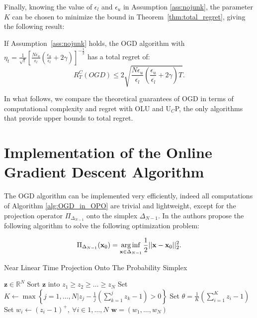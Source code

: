 Finally, knowing the value of $\epsilon_l$ and $\epsilon_u$ in Assumption \ref{ass:nojunk}, the parameter $K$ can be chosen to minimize the bound in Theorem~\ref{thm:total_regret}, giving the following result:

\begin{corollary} \label{cor:optimal_bound}
    If Assumption~\ref{ass:nojunk} holds, the OGD algorithm with $\eta_t = \frac{1}{\sqrt{t}} \left[ \frac{N \epsilon_u}{\epsilon_l} \left( \frac{\epsilon_u}{\epsilon_l} + 2 \gamma \right) \right]^{-\frac{1}{2}}$ has a total regret of:
    \begin{equation*}
        R_T^C(OGD) \leq 2\sqrt{\frac{N \epsilon_u}{\epsilon_l}\left( \frac{\epsilon_u}{\epsilon_l} + 2 \gamma \right) T}.
    \end{equation*}
\end{corollary}

In what follows, we compare the theoretical guarantees of OGD in terms of computational complexity and regret with OLU and U$_C$P, the only algorithms that provide upper bounds to total regret.

\section{Implementation of the Online Gradient Descent Algorithm}\label{sec:implementation}

The OGD algorithm can be implemented very efficiently, indeed all computations of Algorithm \ref{alg:OGD_in_OPO} are trivial and lightweight, except for the projection operator $\Pi_{\Delta_{N-1}}$ onto the simplex $\Delta_{N-1}$. In \cite{duchi2008efficient} the authors propose the following algorithm to solve the following optimization problem:

\begin{equation}
\Pi_{\Delta_{N-1}}(\mathbf x_0)=\operatorname*{arg\,inf}\limits_{\mathbf x\in\Delta_{N-1}}\frac{1}{2}||\mathbf x-\mathbf x_0||_2^2.
\end{equation}


\begin{algorithm}
    \caption{Near Linear Time Projection Onto The Probability Simplex}
    \label{alg:projection}
    \begin{algorithmic}[1]
    \REQUIRE $\mathbf{z}\in\mathbb R^N$ \nonumber
    \STATE Sort $\mathbf z$ into $z_1\ge z_2\ge \ldots \ge z_N$ \label{line:sorting}
    \STATE Set $K\gets\max\left\{j=1,\ldots,N\biggr\rvert z_j-\frac{1}{j}\left(\sum\limits_{k=1}^jz_k-1\right)>0\right\}$
    \STATE Set $\theta=\frac{1}{K}\left(\sum\limits_{i=1}^Kz_i-1\right)$
    \STATE Set $w_i\gets(z_i-1)^+, \ \forall i\in1,\ldots,N$
    \RETURN $\mathbf w=(w_1,\ldots,w_N)$
    \end{algorithmic}
\end{algorithm}

